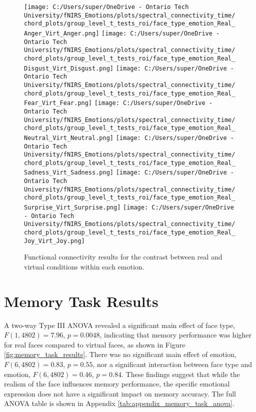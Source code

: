 \begin{figure}[H]
  \centering
  \texttt{[image: C:/Users/super/OneDrive - Ontario Tech University/fNIRS\_Emotions/plots/spectral\_connectivity\_time/chord\_plots/group\_level\_t\_tests\_roi/face\_type\_emotion\_Real\_Anger\_Virt\_Anger.png]}
  \texttt{[image: C:/Users/super/OneDrive - Ontario Tech University/fNIRS\_Emotions/plots/spectral\_connectivity\_time/chord\_plots/group\_level\_t\_tests\_roi/face\_type\_emotion\_Real\_Disgust\_Virt\_Disgust.png]}
  \texttt{[image: C:/Users/super/OneDrive - Ontario Tech University/fNIRS\_Emotions/plots/spectral\_connectivity\_time/chord\_plots/group\_level\_t\_tests\_roi/face\_type\_emotion\_Real\_Fear\_Virt\_Fear.png]}
  \texttt{[image: C:/Users/super/OneDrive - Ontario Tech University/fNIRS\_Emotions/plots/spectral\_connectivity\_time/chord\_plots/group\_level\_t\_tests\_roi/face\_type\_emotion\_Real\_Neutral\_Virt\_Neutral.png]}
  \texttt{[image: C:/Users/super/OneDrive - Ontario Tech University/fNIRS\_Emotions/plots/spectral\_connectivity\_time/chord\_plots/group\_level\_t\_tests\_roi/face\_type\_emotion\_Real\_Sadness\_Virt\_Sadness.png]}
  \texttt{[image: C:/Users/super/OneDrive - Ontario Tech University/fNIRS\_Emotions/plots/spectral\_connectivity\_time/chord\_plots/group\_level\_t\_tests\_roi/face\_type\_emotion\_Real\_Surprise\_Virt\_Surprise.png]}
  \texttt{[image: C:/Users/super/OneDrive - Ontario Tech University/fNIRS\_Emotions/plots/spectral\_connectivity\_time/chord\_plots/group\_level\_t\_tests\_roi/face\_type\_emotion\_Real\_Joy\_Virt\_Joy.png]}
  \caption[FC: Face Type \texorpdfstring{$\times$}{x} Emotion Contrasts]{Functional connectivity results for the contrast between real and virtual conditions within each emotion.}
  \label{fig:fc_real_vs_virtual_emotion_analysis}
\end{figure}

\section{Memory Task Results}
A two-way Type III ANOVA revealed a significant main effect of face type, $F(1,4802)=7.96$, $p=0.0048$, indicating that memory performance was higher for real faces compared to virtual faces, as shown in Figure \ref{fig:memory_task_results}.
There was no significant main effect of emotion, $F(6,4802)=0.83$, $p=0.55$, nor a significant interaction between face type and emotion, $F(6,4802)=0.46$, $p=0.84$. 
These findings suggest that while the realism of the face influences memory performance, the specific emotional expression does not have a significant impact on memory accuracy.
The full ANOVA table is shown in Appendix \ref{tab:appendix_memory_task_anova}.

